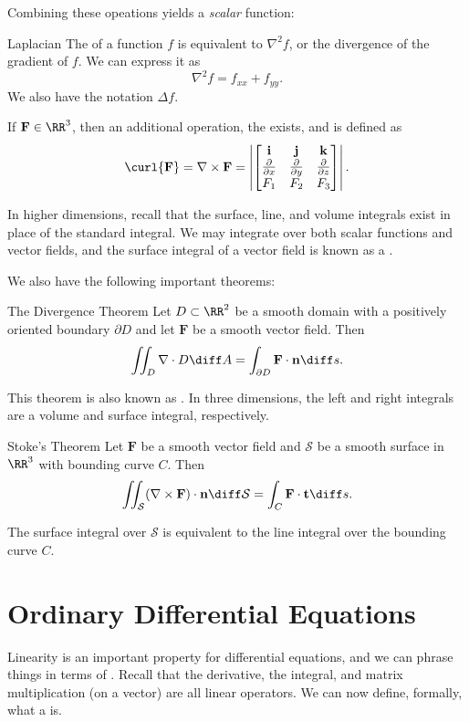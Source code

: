 Combining these opeations yields a \emph{scalar} function: 
\begin{definition}{Laplacian}{}
The  of a function $f$ is equivalent to $\nabla^2 f$, or the divergence of the gradient of $f$. We can express it as 
\[ \nabla^2 f = f_{xx} + f_{yy}. \] We also have the notation $\Delta f$. 

\end{definition}

If $\mathbf{F} \in \RR^3$, then an additional operation, the  exists, and is defined as 
\[ \curl{\mathbf{F}} = \nabla \times \mathbf{F} = \left | \begin{bmatrix} \mathbf{i} & \mathbf{j} & \mathbf{k} \\ \frac{\partial}{\partial x} & \frac{\partial}{\partial y} & \frac{\partial}{\partial z} \\ F_1 & F_2 & F_3 \end{bmatrix} \right | . \] 

In higher dimensions, recall that the surface, line, and volume integrals exist in place of the standard integral. We may integrate over both scalar functions and vector fields, and the surface integral of a vector field is known as a . 

We also have the following important theorems:
\begin{theorem}{The Divergence Theorem}{}
Let $D \subset \RR^2$ be a smooth domain with a positively oriented boundary $\partial D$ and let $\mathbf{F}$ be a smooth vector field. Then 
\[ \iint_D \nabla \cdot D \diff A = \int_{\partial D} \mathbf{F} \cdot \mathbf{n} \diff s. \]
\end{theorem}
This theorem is also known as . In three dimensions, the left and right integrals are a volume and surface integral, respectively. 

\begin{theorem}{Stoke's Theorem}{}
Let $\mathbf{F}$ be a smooth vector field and $\mathcal S$ be a smooth surface in $\RR^3$ with bounding curve $C$. Then 
\[ \iint_\mathcal{S} (\nabla \times \mathbf{F}) \cdot \mathbf{n} \diff \mathcal{S} = \int_C \mathbf{F} \cdot \mathbf{t} \diff s. \] 
\end{theorem}

The surface integral over $\mathcal{S}$ is equivalent to the line integral over the bounding curve $C$. 


\section{Ordinary Differential Equations}
Linearity is an important property for differential equations, and we can phrase things in terms of . Recall that the derivative, the integral, and matrix multiplication (on a vector) are all linear operators. We can now define, formally, what a  is. 

